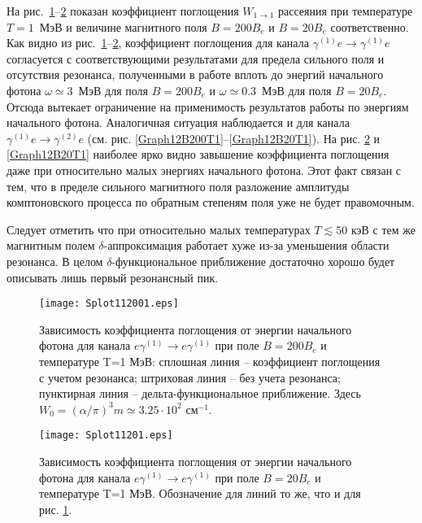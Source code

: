 На рис.~\ref{Graph11B200T1}--\ref{Graph11B20T1} показан  коэффициент поглощения $W_{1\to1}$ рассеяния при температуре $T=1 $~МэВ и величине магнитного поля $B=200B_e$ и $B=20B_e$ соответственно. Как видно из рис.~\ref{Graph11B200T1}--\ref{Graph11B20T1}, коэффициент поглощения для канала $\gamma^{(1)}e\to\gamma^{(1)}e$ согласуется с соответствующими результатами для предела сильного поля и отсутствия резонанса, полученными в работе \cite{Chistyakov:2009} вплоть до энергий начального фотона  $\omega\simeq3$~МэВ для поля $B=200B_e$ и  $\omega\simeq0.3$~МэВ для поля $B=20B_e$. Отсюда вытекает ограничение на применимость результатов работы \cite{Chistyakov:2009} по энергиям начального фотона. Аналогичная ситуация наблюдается и для канала $\gamma^{(1)}e\to\gamma^{(2)}e$ (см. рис. \ref{Graph12B200T1}--\ref{Graph12B20T1}).  На рис. \ref{Graph11B20T1} и \ref{Graph12B20T1} наиболее ярко видно завышение коэффициента поглощения даже при относительно малых энергиях начального фотона. Этот факт связан с тем, что в пределе сильного магнитного поля разложение амплитуды комптоновского процесса по обратным степеням поля уже не будет правомочным.  

Следует отметить   что при относительно малых температурах $T\lesssim50$ кэВ с 
тем же магнитным полем $\delta$-аппроксимация работает хуже из-за уменьшения 
области резонанса. В целом $\delta$-функциональное приближение достаточно 
хорошо будет описывать лишь первый резонансный пик.

\begin{figure}[t!]\centering
	\texttt{[image: Splot112001.eps]}
	\caption{Зависимость коэффициента поглощения от энергии начального фотона для канала $e\gamma^{(1)}\to e\gamma^{(1)}$ при поле $B=200 B_e$ и температуре T=1 МэВ: сплошная линия -- коэффициент поглощения с учетом резонанса; штриховая линия -- без учета резонанса; пунктирная линия -- дельта-функциональное приближение. Здесь $W_0=(\alpha/\pi)^3m\simeq 3.25\cdot10^2$ см$^{-1}$.}
	\label{Graph11B200T1}
\end{figure}

\begin{figure}[t!]\centering
	\texttt{[image: Splot11201.eps]}
	\caption{Зависимость коэффициента поглощения от энергии начального фотона для канала $e\gamma^{(1)}\to e\gamma^{(1)}$ при поле $B=20 B_e$ и температуре T=1 МэВ. Обозначение для линий то же, что и для рис. \ref{Graph11B200T1}.}
	\label{Graph11B20T1}
\end{figure}


